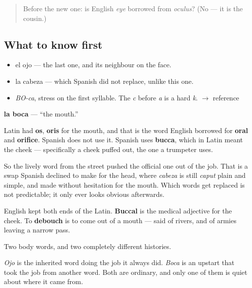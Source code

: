 \label{lesson:ES-C286-boca}



\begin{quote}
Before the new one: is English \emph{eye} borrowed from \emph{oculus}? (No — it is the cousin.)
\end{quote}

\subsection*{What to know first}
\begin{itemize}
\raggedright
  \item el ojo — the last one, and its neighbour on the face.
  \item la cabeza — which Spanish did not replace, unlike this one.
\end{itemize}

\begin{sounds}
\begin{itemize}
\raggedright
  \item \emph{BO-ca}, stress on the first syllable. The \emph{c} before \emph{a} is a hard \emph{k}. $\to$ reference
\end{itemize}
\end{sounds}

\begin{cousinweb}
\textbf{la boca} — \textquotedblleft{}the mouth.\textquotedblright{}

Latin had \textbf{os}, \textbf{oris} for the mouth, and that is the word English borrowed for \textbf{oral} and \textbf{orifice}. Spanish does not use it. Spanish uses \textbf{bucca}, which in Latin meant the cheek — specifically a cheek puffed out, the one a trumpeter uses.

So the lively word from the street pushed the official one out of the job. That is a swap Spanish declined to make for the head, where \emph{cabeza} is still \emph{caput} plain and simple, and made without hesitation for the mouth. Which words get replaced is not predictable; it only ever looks obvious afterwards.

English kept both ends of the Latin. \textbf{Buccal} is the medical adjective for the cheek. To \textbf{debouch} is to come out of a mouth — said of rivers, and of armies leaving a narrow pass.
\end{cousinweb}

\begin{grammarlens}[title={What you've built}]
Two body words, and two completely different histories.

\emph{Ojo} is the inherited word doing the job it always did. \emph{Boca} is an upstart that took the job from another word. Both are ordinary, and only one of them is quiet about where it came from.
\end{grammarlens}

